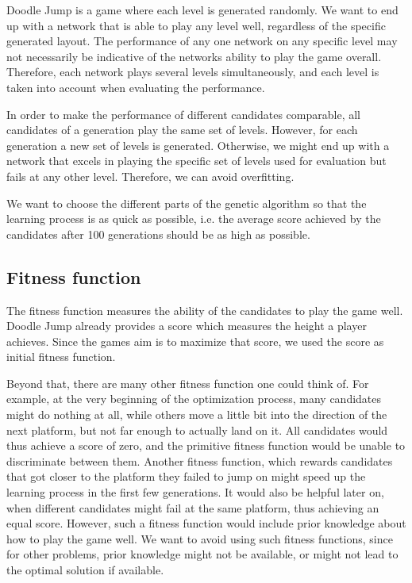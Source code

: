 \documentclass[a4paper,12pt,pagesize,headsepline,bibtotoc,titlepage,abstracton]{scrartcl}
\begin{document}
Doodle Jump is a game where each level is generated randomly. We want to end up with a network that is able to play any level well, regardless of the specific generated layout. The performance of any one network on any specific level may not necessarily be indicative of the networks ability to play the game overall. Therefore, each network plays several levels simultaneously, and each level is taken into account when evaluating the performance.

In order to make the performance of different candidates comparable, all candidates of a generation play the same set of levels. However, for each generation a new set of levels is generated. Otherwise, we might end up with a network that excels in playing the specific set of levels used for evaluation but fails at any other level. Therefore, we can avoid overfitting.

We want to choose the different parts of the genetic algorithm so that the learning process is as quick as possible, i.e. the average score achieved by the candidates after 100 generations should be as high as possible.

\subsection{Fitness function}

The fitness function measures the ability of the candidates to play the game well. Doodle Jump already provides a score which measures the height a player achieves. Since the games aim is to maximize that score, we used the score as initial fitness function.

Beyond that, there are many other fitness function one could think of. For example, at the very beginning of the optimization process, many candidates might do nothing at all, while others move a little bit into the direction of the next platform, but not far enough to actually land on it. All candidates would thus achieve a score of zero, and the primitive fitness function would be unable to discriminate between them. Another fitness function, which rewards candidates that got closer to the platform they failed to jump on might speed up the learning process in the first few generations. It would also be helpful later on, when different candidates might fail at the same platform, thus achieving an equal score. However, such a fitness function would include prior knowledge about how to play the game well. We want to avoid using such fitness functions, since for other problems, prior knowledge might not be available, or might not lead to the optimal solution if available. 
\end{document}
